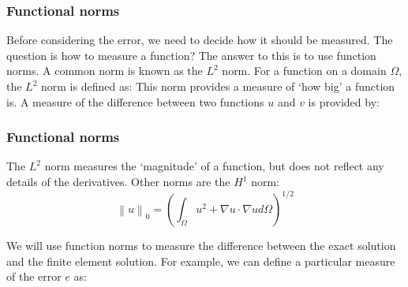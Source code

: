 \documentclass[handout]{beamer}
\begin{document}
\begin{frame}
\frametitle{Functional norms}
Before considering the error, we need to decide how it should be measured. The question
is how to measure a function? The answer to this is to use function norms. A common
norm is known as the $L^2$ norm. For a function on a domain $\Omega$, the $L^2$ norm is defined
as:
This norm provides a measure of ‘how big’ a function is. A measure of the difference
between two functions $u$ and $v$ is provided by:
\end{frame}

\begin{frame}
\frametitle{Functional norms}
The $L^2$ norm measures the `magnitude' of a function, but does not reflect any details of
the derivatives. Other norms are the $H^1$ norm:
	\begin{equation*}
	\left\lVert u \right\rVert_0 = \left(\int_\Omega u^2 + \nabla u \cdot \nabla u d\Omega \right)^{1/2}
	\end{equation*}

We will use function norms to measure the difference between the exact solution and
the finite element solution. For example, we can define a particular measure of the error
$e$ as:


\end{frame}
\end{document}
